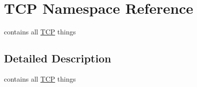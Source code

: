 \hypertarget{namespace_t_c_p}{}\section{T\+CP Namespace Reference}
\label{namespace_t_c_p}


contains all \hyperlink{namespace_t_c_p}{T\+CP} things  




\subsection{Detailed Description}
contains all \hyperlink{namespace_t_c_p}{T\+CP} things 